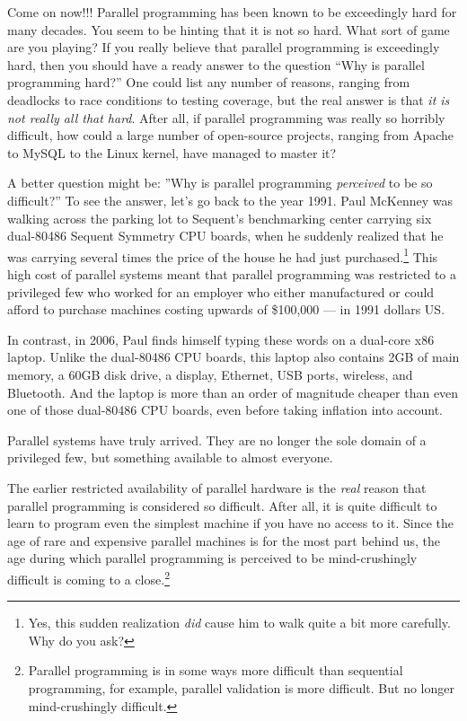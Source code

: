\QuickQ{}
	Come on now!!!
	Parallel programming has been known to be exceedingly
	hard for many decades.
	You seem to be hinting that it is not so hard.
	What sort of game are you playing?
\QuickA{}
	If you really believe that parallel programming is exceedingly
	hard, then you should have a ready answer to the question
	``Why is parallel programming hard?''
	One could list any number of reasons, ranging from deadlocks to
	race conditions to testing coverage, but the real answer is that
	{\em it is not really all that hard}.
	After all, if parallel programming was really so horribly difficult,
	how could a large number of open-source projects, ranging from Apache
	to MySQL to the Linux kernel, have managed to master it?

	A better question might be: ''Why is parallel programming {\em
	perceived} to be so difficult?''
	To see the answer, let's go back to the year 1991.
	Paul McKenney was walking across the parking lot to Sequent's
	benchmarking center carrying six dual-80486 Sequent Symmetry CPU
	boards, when he suddenly realized that he was carrying several
	times the price of the house he had just purchased.\footnote{
		Yes, this sudden realization {\em did} cause him to walk quite
		a bit more carefully.
		Why do you ask?}
	This high cost of parallel systems meant that
	parallel programming was restricted to a privileged few who
	worked for an employer who either manufactured or could afford to
	purchase machines costing upwards of \$100,000 --- in 1991 dollars US.

	In contrast, in 2006, Paul finds himself typing these words on a
	dual-core x86 laptop.
	Unlike the dual-80486 CPU boards, this laptop also contains
	2GB of main memory, a 60GB disk drive, a display, Ethernet,
	USB ports, wireless, and Bluetooth.
	And the laptop is more than an order of magnitude cheaper than
	even one of those dual-80486 CPU boards, even before taking inflation
	into account.

	Parallel systems have truly arrived.
	They are no longer the sole domain of a privileged few, but something
	available to almost everyone.

	The earlier restricted availability of parallel hardware is
	the \emph{real} reason that parallel programming is considered
	so difficult.
	After all, it is quite difficult to learn to program even the simplest
	machine if you have no access to it.
	Since the age of rare and expensive parallel machines is for the most
	part behind us, the age during which
	parallel programming is perceived to be mind-crushingly difficult is
	coming to a close.\footnote{
		Parallel programming is in some ways more difficult than
		sequential programming, for example, parallel validation
		is more difficult.
		But no longer mind-crushingly difficult.}

